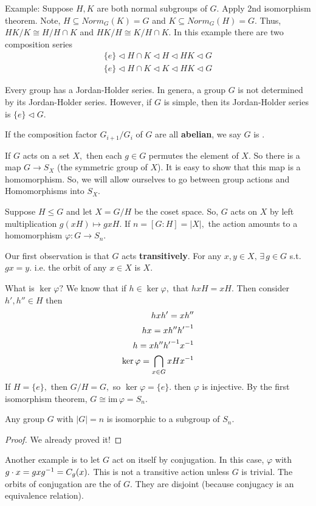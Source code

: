 \documentclass[a4paper]{article}
\begin{document}
Example: Suppose $H,K$ are both normal subgroups of $G.$ Apply 2nd isomorphism theorem. Note, $H\subseteq Norm_G(K)=G$ and $K\subseteq Norm_G(H)=G.$ Thus, $HK/K\cong H/H\cap K$ and $HK/H\cong K/H\cap K.$ In this example there are two composition series\begin{align}
    \{e\}\triangleleft H\cap K\triangleleft H\triangleleft HK\triangleleft G\\
    \{e\}\triangleleft H\cap K\triangleleft K\triangleleft HK\triangleleft G
\end{align}

Every group has a Jordan-Holder series. In genera, a group $G$ is not determined by its Jordan-Holder series. However, if $G$ is simple, then its Jordan-Holder series is $\{e\}\triangleleft G.$

\begin{definition}[Solvable]
    If the composition factor $G_{i+1}/G_i$ of $G$ are all \textbf{abelian}, we say $G$ is .
\end{definition}

If $G$ acts on a set $X,$ then each $g\in G$ permutes the element of $X.$ So there is a map $G\to S_X$ (the symmetric group of $X$). It is easy to show that this map is a homomorphism. So, we will allow ourselves to go between group actions and Homomorphisms into $S_X.$

Suppose $H\leq G$ and let $X=G/H$ be the coset space. So, $G$ acts on $X$ by left multiplication $g(xH)\mapsto gxH.$ If $n=[G:H]=|X|,$ the action amounts to a homomorphism $\varphi:G\to S_n.$

Our first observation is that $G$ acts \textbf{transitively}. For any $x,y\in X,\,\exists\,g\in G$ s.t. $gx=y.$ i.e. the orbit of any $x\in X$ is $X.$

What is $\ker\varphi?$ We know that if $h\in\ker\varphi,$ that $hxH=xH.$ Then consider $h',h''\in H$ then \begin{align}
    hxh'=xh''\\
    hx=xh''{h'}^{-1}\\
    h=xh''{h'}^{-1} x^{-1}\\
    \ker\varphi=\bigcap_{x\in G}xHx^{-1}
\end{align}
If $H=\{e\},$ then $G/H=G,$ so $\ker\varphi=\{e\}.$ then $\varphi$ is injective. By the first isomorphism theorem, $G\cong \mathrm{im}\,\varphi=S_n.$
\begin{theorem}[Cayley]
    Any group $G$ with $|G|=n$ is isomorphic to a subgroup of $S_n.$
    \begin{proof}
        We already proved it!
    \end{proof}
\end{theorem}
Another example is to let $G$ act on itself by conjugation. In this case, $\varphi$ with $g\cdot x=gxg^{-1}=C_g(x).$ This is not a transitive action unless $G$ is trivial.  The orbits of conjugation are the  of $G.$ They are disjoint (because conjugacy is an equivalence relation). 
\end{document}
